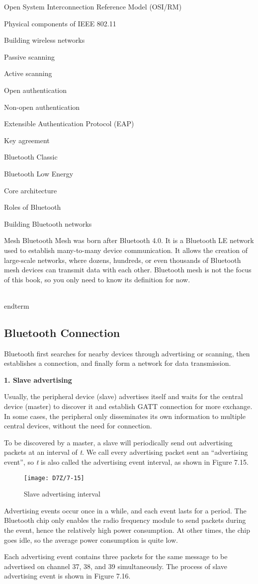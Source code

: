 \documentclass[a4paper,12pt]{book}
\begin{document}
\begin{term}{Open System Interconnection Reference Model (OSI/RM)}
\begin{term}{Physical components of IEEE 802.11}
\begin{term}{Building wireless networks}
\begin{term}{Passive scanning}
\begin{term}{Active scanning}
\begin{term}{Open authentication}
\begin{term}{Non-open authentication}
\begin{term}{Extensible Authentication Protocol (EAP)}
\begin{term}{Key agreement}
\begin{term}{Bluetooth Classic}
\begin{term}{Bluetooth Low Energy}
\begin{term}{Core architecture}
\begin{term}{Roles of Bluetooth}
\begin{term}{Building Bluetooth networks}
    \begin{secterm}{Mesh}
        Bluetooth Mesh was born after Bluetooth 4.0. It is a Bluetooth LE network used to establish many-to-many device communication. It allows the creation of large-scale networks, where dozens, hundreds, or even thousands of Bluetooth mesh devices can transmit data with each other. Bluetooth mesh is not the focus of this book, so you only need to know its definition for now.
    \end{secterm}
\\end{term}{}

\subsection{Bluetooth Connection}
Bluetooth first searches for nearby devices through advertising or scanning, then establishes a connection, and finally form a network for data transmission.

\textbf{1. Slave advertising}

Usually, the peripheral device (slave) advertises itself and waits for the central device (master) to discover it and establish GATT connection for more exchange. In some cases, the peripheral only disseminates its own information to multiple central devices, without the need for connection.

To be discovered by a master, a slave will periodically send out advertising packets at an interval of \textit{t}. We call every advertising packet sent an “advertising event”, so \textit{t} is also called the advertising event interval, as shown in Figure 7.15.

\begin{figure}[!h]
    \centering
    \texttt{[image: D7Z/7-15]}
    \caption{Slave advertising interval}
\end{figure}

Advertising events occur once in a while, and each event lasts for a period. The Bluetooth chip only enables the radio frequency module to send packets during the event, hence the relatively high power consumption. At other times, the chip goes idle, so the average power consumption is quite low.

Each advertising event contains three packets for the same message to be advertised on channel 37, 38, and 39 simultaneously. The process of slave advertising event is shown in Figure 7.16.


\end{term}
\end{term}
\end{term}
\end{term}
\end{term}
\end{term}
\end{term}
\end{term}
\end{term}
\end{term}
\end{term}
\end{term}
\end{term}
\end{term}
\end{document}
